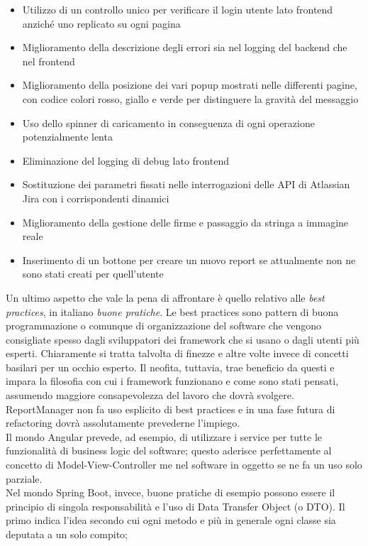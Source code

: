 \begin{itemize}
    \item Utilizzo di un controllo unico per verificare il login utente lato frontend anziché uno replicato su ogni pagina
    \item Miglioramento della descrizione degli errori sia nel logging del backend che nel frontend
    \item Miglioramento della posizione dei vari popup mostrati nelle differenti pagine, con codice colori rosso, giallo e verde per distinguere la gravità del messaggio
    \item Uso dello spinner di caricamento in conseguenza di ogni operazione potenzialmente lenta
    \item Eliminazione del logging di debug lato frontend
    \item Sostituzione dei parametri fissati nelle interrogazioni delle API di Atlassian Jira con i corrispondenti dinamici
    \item Miglioramento della gestione delle firme e passaggio da stringa a immagine reale
    \item Inserimento di un bottone per creare un nuovo report se attualmente non ne sono stati creati per quell'utente
\end{itemize}
Un ultimo aspetto che vale la pena di affrontare è quello relativo alle \emph{best practices}, in italiano \emph{buone pratiche}.
Le best practices sono pattern di buona programmazione o comunque di organizzazione del software che vengono
consigliate spesso dagli sviluppatori dei framework che si usano o dagli utenti più esperti.
Chiaramente si tratta talvolta di finezze e altre volte invece di concetti basilari per un occhio esperto.
Il neofita, tuttavia, trae beneficio da questi e impara la filosofia con cui i framework funzionano e come sono
stati pensati, assumendo maggiore consapevolezza del lavoro che dovrà svolgere.
ReportManager non fa uso esplicito di best practices e in una fase futura di refactoring dovrà assolutamente
prevederne l'impiego.
\\
Il mondo Angular prevede, ad esempio, di utilizzare i service per tutte le funzionalità di business logic del
software; questo aderisce perfettamente al concetto di Model-View-Controller me nel software in oggetto se ne fa
un uso solo parziale.
\\
Nel mondo Spring Boot, invece, buone pratiche di esempio possono essere il principio di singola responsabilità e
l'uso di Data Transfer Object (o DTO).
Il primo indica l'idea secondo cui ogni metodo e più in generale ogni classe sia deputata a un solo compito;
